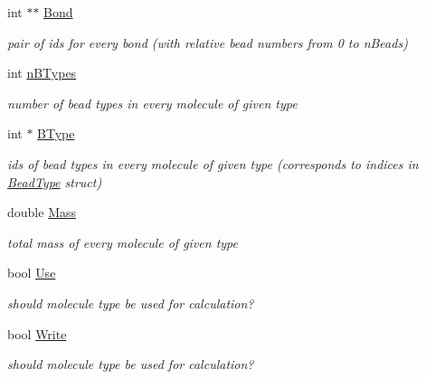 \begin{DoxyCompactItemize}
\mbox{\label{structMoleculeType_a1506026ffd6d002ebfe9e35d9021e98b}} 
int $\ast$$\ast$ \hyperlink{structMoleculeType_a1506026ffd6d002ebfe9e35d9021e98b}{Bond}
\begin{DoxyCompactList}\small\item\em pair of ids for every bond (with relative bead numbers from 0 to n\+Beads) \end{DoxyCompactList}\item 
\mbox{\label{structMoleculeType_a3a8b5f74a6b4f1620881dd5ba4600e42}} 
int \hyperlink{structMoleculeType_a3a8b5f74a6b4f1620881dd5ba4600e42}{n\+B\+Types}
\begin{DoxyCompactList}\small\item\em number of bead types in every molecule of given type \end{DoxyCompactList}\item 
\mbox{\label{structMoleculeType_a5437e3b5fd5370724dd9658802c5a117}} 
int $\ast$ \hyperlink{structMoleculeType_a5437e3b5fd5370724dd9658802c5a117}{B\+Type}
\begin{DoxyCompactList}\small\item\em ids of bead types in every molecule of given type (corresponds to indices in \hyperlink{structBeadType}{Bead\+Type} struct) \end{DoxyCompactList}\item 
\mbox{\label{structMoleculeType_ae9f50aeb523c9c5ad3975a85a044ac3c}} 
double \hyperlink{structMoleculeType_ae9f50aeb523c9c5ad3975a85a044ac3c}{Mass}
\begin{DoxyCompactList}\small\item\em total mass of every molecule of given type \end{DoxyCompactList}\item 
\mbox{\label{structMoleculeType_ace0b01e88b47b3ce15403a2ae85c10e9}} 
bool \hyperlink{structMoleculeType_ace0b01e88b47b3ce15403a2ae85c10e9}{Use}
\begin{DoxyCompactList}\small\item\em should molecule type be used for calculation? \end{DoxyCompactList}\item 
\mbox{\label{structMoleculeType_a743efb743a01f088c6345ce46fe91805}} 
bool \hyperlink{structMoleculeType_a743efb743a01f088c6345ce46fe91805}{Write}
\begin{DoxyCompactList}\small\item\em should molecule type be used for calculation? \end{DoxyCompactList}\end{DoxyCompactItemize}
